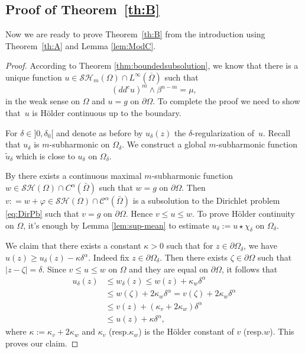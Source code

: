 \documentclass[11pt]{article}
\newcommand{\resp}{resp.\xspace}
\numberwithin{equation}{section}
\theoremstyle{definition}
\newcommand{\Cc}{\mathcal{C}}
\theoremstyle{plain}
\theoremstyle{definition}
\begin{document}
\subsection{Proof of Theorem~\ref{th:B}}

Now we are ready to prove Theorem~\ref{th:B} from the introduction using Theorem~\ref{th:A} and Lemma \ref{lem:ModC}.

\begin{proof} According to Theorem \ref{thm:boundedsubsolution}, we know that there is a unique function $u\in \mathcal{SH}_m(\Omega)\cap L^{\infty}(\overline{\Omega}) $ such that
\[
(dd^c u)^m\wedge\beta^{n-m}=\mu,
\]
in the weak sense on $\Omega$ and $ u=g $ on $\partial\Omega$. To complete the proof we need to show that~$u$ is Hölder continuous up to the boundary.

For $\delta\in{}]0,\delta_0[$ and denote as before by $u_{\delta}(z)$ the $\delta$-regularization of~$u$. Recall that ${u}_{\delta}$ is $m$-subharmonic on $\Omega_\delta$. We construct a global $m$-subharmonic function $\tilde{u}_{\delta}$ which is close to ${u}_{\delta}$ on $\Omega_\delta$.

By \cite{Ch16} there exists a continuous maximal $m$-subharmonic function $w \in \mathcal{SH} (\Omega) \cap C^{\alpha} (\bar \Omega)$ such that $w = g$ on $\partial \Omega$. Then $v: = w + \varphi \in \mathcal{SH} (\Omega) \cap \Cc^{\alpha} (\bar \Omega)$ is a subsolution to the Dirichlet problem \eqref{eq:DirPb} such that $v = g$ on $\partial \Omega$. Hence $v \leq u \leq w$. To prove Hölder continuity on $\Omega$, it's enough by Lemma \ref{lem:sup-mean} to estimate $u_\delta:= u \star \chi_\delta$
on $\Omega_\delta$.

We claim that there exists a constant $\kappa > 0$ such that for $z\in\partial\Omega_{\delta}$, we have $ u (z) \geq {u}_{\delta}(z) - \kappa \delta^{\alpha} $. Indeed fix $z\in\partial\Omega_{\delta}$. Then there exists $\zeta \in \partial \Omega$ such that $\vert z -\zeta \vert = \delta$. Since $v \leq u \leq w$ on $\Omega$ and they are equal on $\partial \Omega$, it follows that
\begin{align*}
u_{\delta} (z) & \leq w_\delta (z) \leq w (z) + \kappa_w \delta^\alpha \\
& \leq w (\zeta) + 2 \kappa_w \delta^\alpha = v (\zeta) + 2 \kappa_w \delta^\alpha \\
& \leq v (z) +( \kappa_v + 2 \kappa_w) \delta^\alpha \\
& \leq u (z) + \kappa \delta^\alpha,
\end{align*}
where $\kappa:= \kappa_v + 2 \kappa_w$ and $ \kappa_v$ (\resp $\kappa_w$) is the Hölder constant of $v$ (\resp $w$). This proves our claim.


\end{proof}
\end{document}
